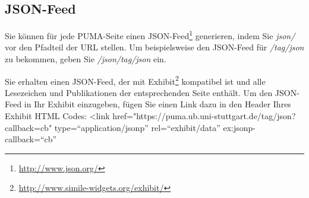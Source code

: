 \subsection{JSON-Feed}
\label{subsec:jsonFeed}
Sie können für jede PUMA-Seite einen JSON-Feed\footnote{\url{http://www.json.org/}} generieren, indem Sie \textit{json/} vor den Pfadteil der URL stellen. Um beispielsweise den JSON-Feed für \textit{/tag/json} zu bekommen, geben Sie \textit{/json/tag/json} ein.

Sie erhalten einen JSON-Feed, der mit Exhibit\footnote{\url{http://www.simile-widgets.org/exhibit/}} kompatibel ist und alle Lesezeichen und Publikationen der entsprechenden Seite enthält. Um den JSON-Feed in Ihr Exhibit einzugeben, fügen Sie einen Link dazu in den Header Ihres Exhibit HTML Codes:\newline
\newline
<link href="https://puma.ub.uni-stuttgart.de/tag/json?callback=cb" type=\enquote{application/jsonp} rel=\enquote{exhibit/data} ex:jsonp-callback=\enquote{cb}%
\newline

